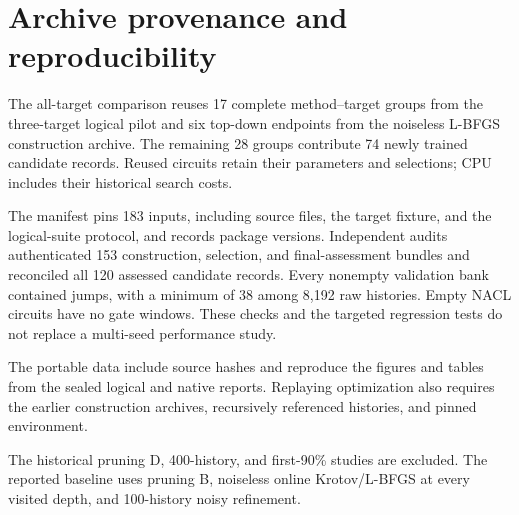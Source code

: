 \section{Archive provenance and reproducibility}
\label{app:provenance}

The all-target comparison reuses 17 complete method--target groups from
the three-target logical pilot and six top-down endpoints from the
noiseless L-BFGS construction archive. The remaining 28 groups contribute
74 newly trained candidate records. Reused circuits retain their
parameters and selections; CPU includes their historical search costs.

The manifest pins 183 inputs, including source files, the target fixture,
and the logical-suite protocol, and records package versions. Independent
audits authenticated 153 construction, selection, and final-assessment
bundles and reconciled all 120 assessed candidate records. Every nonempty
validation bank contained jumps, with a minimum of 38 among 8,192 raw
histories. Empty NACL circuits have no gate windows. These checks and the
targeted regression tests do not replace a multi-seed performance study.

The portable data include source hashes and reproduce the figures and
tables from the sealed logical and native reports. Replaying optimization
also requires the earlier construction archives, recursively referenced
histories, and pinned environment.

The historical pruning D, 400-history, and first-90\% studies are
excluded. The reported baseline uses pruning B, noiseless online
Krotov/L-BFGS at every visited depth, and 100-history noisy refinement.
